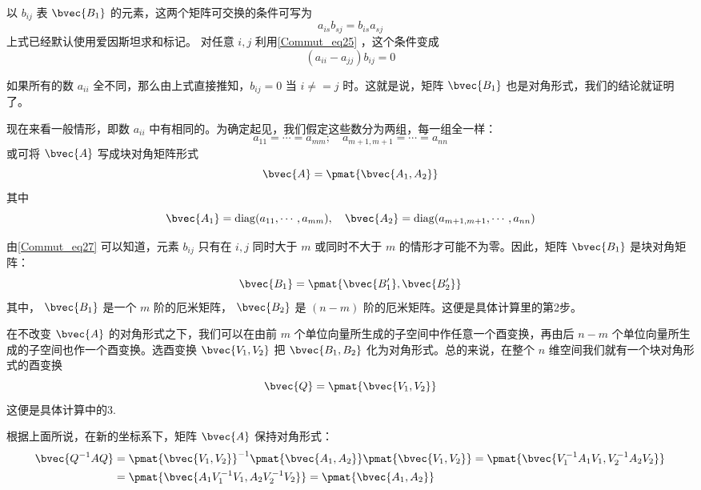 以 $b_{ij}$ 表 $\bvec{B_1}$ 的元素，这两个矩阵可交换的条件可写为
\begin{equation}
a_{is}b_{sj}=b_{is}a_{sj}
\end{equation}
上式已经默认使用爱因斯坦求和标记。
对任意 $i,j$ 利用\autoref{Commut_eq25} ，这个条件变成
\begin{equation}
(a_{ii}-a_{jj})b_{ij}=0
\label{Commut_eq27}
\end{equation}

如果所有的数 $a_{ii}$ 全不同，那么由上式直接推知，$b_{ij}=0$ 当 $i\neq=j$ 时。这就是说，矩阵 $\bvec{B_1}$ 也是对角形式，我们的结论就证明了。

现在来看一般情形，即数 $a_{ii}$ 中有相同的。为确定起见，我们假定这些数分为两组，每一组全一样：
\begin{equation}
a_{11}=\cdots=a_{mm};\quad a_{m+1,m+1}=\cdots=a_{nn}
\end{equation}
或可将 $\bvec{A}$ 写成块对角矩阵形式
\begin{equation}
\bvec{A}=\pmat{\bvec{A_1,A_2}}
\end{equation}
其中
\begin{equation}
\bvec{A_1}=\mathrm{diag}(a_{11},\cdots,a_{mm}),\quad
\bvec{A_2}=\mathrm{diag}(a_{m+1,m+1},\cdots,a_{nn})
\end{equation}

由\autoref{Commut_eq27} 可以知道，元素 $b_{ij}$ 只有在 $i,j$ 同时大于 $m$ 或同时不大于 $m$ 的情形才可能不为零。因此，矩阵 $\bvec{B_1}$ 是块对角矩阵：
\begin{equation}
\bvec{B_1}=\pmat{\bvec{B'_1},\bvec{B'_2}}
\end{equation}
其中， $\bvec{B_1}$ 是一个 $m$ 阶的厄米矩阵， $\bvec{B_2}$ 是 $(n-m)$ 阶的厄米矩阵。这便是具体计算里的第2步。

在不改变 $\bvec{A}$ 的对角形式之下，我们可以在由前 $m$ 个单位向量所生成的子空间中作任意一个酉变换，再由后 $n-m$ 个单位向量所生成的子空间也作一个酉变换。选酉变换 $\bvec{V_1,V_2}$ 把 $\bvec{B_1,B_2}$ 化为对角形式。总的来说，在整个 $n$ 维空间我们就有一个块对角形式的酉变换
\begin{equation}
\bvec{Q}=\pmat{\bvec{V_1,V_2}}
\end{equation}
这便是具体计算中的3.

根据上面所说，在新的坐标系下，矩阵 $\bvec{A}$ 保持对角形式：
\begin{equation}
\begin{aligned}
\bvec{Q^{-1}AQ}&=\pmat{\bvec{V_1,V_2}}^{-1}\pmat{\bvec{A_1,A_2}}\pmat{\bvec{V_1,V_2}}=\pmat{\bvec{V_1^{-1}A_1V_1,V_2^{-1}A_2V_2}}\\
&=\pmat{\bvec{A_1V_1^{-1}V_1,A_2V_2^{-1}V_2}}=\pmat{\bvec{A_1,A_2}}
\end{aligned}
\end{equation}

